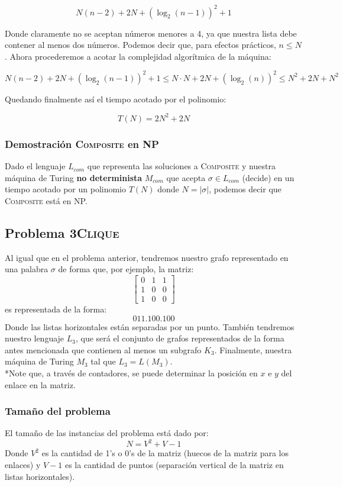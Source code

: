 \documentclass[spanish, draft]{article}
\begin{document}
  $$N(n - 2) + 2N + (\log_2(n-1))^2 + 1$$

  Donde claramente no se aceptan números menores a 4, ya que nuestra lista debe contener al menos dos números. Podemos decir que, para efectos prácticos, $n \leq N$. Ahora procederemos a acotar la complejidad algorítmica de la máquina:

  $$N(n - 2) + 2N + (\log_2(n-1))^2 + 1 \leq N \cdot N + 2N + (\log_2(n))^2 \leq N^2 + 2N + N^2$$

  Quedando finalmente así el tiempo acotado por el polinomio:

  $$T(N) = 2N^2 + 2N$$

  \subsubsection{Demostración \textsc{Composite} en NP}
  Dado el lenguaje $L_{com}$ que representa las soluciones a \textsc{Composite} y nuestra máquina de Turing \textbf{no determinista} $M_{com}$ que acepta $\sigma \in L_{com}$ (decide) en un tiempo acotado por un polinomio $T(N)$ donde $N = |\sigma|$, podemos decir que \textsc{Composite} está en NP.




  \subsection{Problema \textsc{3Clique}}
    Al igual que en el problema anterior, tendremos nuestro grafo representado en una palabra $\sigma$ de forma que, por ejemplo, la matriz:
    \begin{equation}
      \begin{bmatrix}
        0 & 1 & 1 \\
        1 & 0 & 0 \\
        1 & 0 & 0
      \end{bmatrix}
    \end{equation}
    es representada de la forma:
    $$011.100.100$$
    Donde las listas horizontales están separadas por un punto. También tendremos nuestro lenguaje $L_{3}$, que será el conjunto de grafos representados de la forma antes mencionada que contienen al menos un subgrafo $K_3$. Finalmente, nuestra máquina de Turing $M_3$ tal que $L_3 = L(M_3)$.
    \\
    *Note que, a través de contadores, se puede determinar la posición en $x$ e $y$ del enlace en la matriz.
    
    \subsubsection{Tamaño del problema}
    El tamaño de las instancias del problema está dado por:
    $$N = V^2 + V - 1$$
    Donde $V^2$ es la cantidad de 1's o 0's de la matriz (huecos de la matriz para los enlaces) y $V - 1$ es la cantidad de puntos (separación vertical de la matriz en listas horizontales).
    
\end{document}
